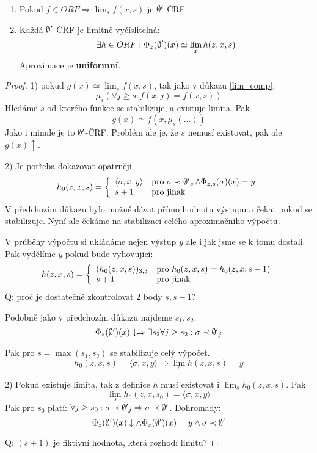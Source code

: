 \begin{theorem}
	\begin{enumerate}
		\item Pokud $f \in ORF \Rightarrow \lim_s f(x, s)$ je $\operatorname{\emptyset^{\prime}}$-ČRF.
		\item Každá $\operatorname{\emptyset^{\prime}}$-ČRF je limitně vyčíslitelná:
			\[ \exists h \in ORF: \Phi_{z}(\operatorname{\emptyset^{\prime}})(x) \simeq \lim_x h(z, x, s) \]
		Aproximace je \textbf{uniformní}.
	\end{enumerate}
\end{theorem}
\begin{proof}
	1) pokud $g(x) \simeq \lim_s f(x, s)$, tak jako v důkazu \cref{lim_comp}:
	\[ \mu_s(\forall j \geq s: f(x, j) = f(x, s)) \]
	Hledáme $s$ od kterého funkce se stabilizuje, a existuje limita.
	Pak
	\[ g(x) \simeq f(x, \mu_s(\ldots)) \]
	Jako i minule je to $\operatorname{\emptyset^{\prime}}$-ČRF.
	Problém ale je, že $s$ nemusí existovat, pak ale $g(x) \uparrow$.

	2) Je potřeba dokazovat opatrněji.
	\[ h_0(z, x, s) = \left\{ \begin{array}{ll}  \langle \sigma, x, y \rangle & \mbox{pro }  \sigma \prec \operatorname{\emptyset^{\prime}}_s \land \Phi_{z, s}(\sigma)(x) = y \\ s + 1 & \mbox{pro } \text{jinak} \end{array} \right. \]
	V předchozím důkazu bylo možné dávat přímo hodnotu výstupu a čekat pokud se stabilizuje.
	Nyní ale čekáme na stabilizaci celého aproximačního výpočtu.

	V průběhy výpočtu si ukládáme nejen výstup $y$ ale i jak jsme se k tomu dostali.
	Pak vydělíme $y$ pokud bude vyhovující:
	\[ h(z, x, s) = \left\{ \begin{array}{ll}  (h_0(z, x, s))_{3, 3}  & \mbox{pro }  h_0(z, x, s) = h_0(z, x, s - 1) \\ s + 1 & \mbox{pro } \text{jinak} \end{array} \right. \]
	Q: proč je dostatečné zkontrolovat 2 body $s, s - 1$?

	Podobně jako v předchozím důkazu najdeme $s_1, s_2$:
	\[ \Phi_z(\operatorname{\emptyset^{\prime}})(x) \downarrow \Rightarrow \exists s_2 \forall j \geq s_2: \sigma \prec \operatorname{\emptyset^{\prime}}_j \]

	Pak pro $s = \max(s_1, s_2)$ se stabilizuje celý výpočet.
	\[ h_0(z, x, s) = \langle \sigma, x, y \rangle \Rightarrow \lim_s h(z, x, s) = y \]

	2) Pokud existuje limita, tak z definice $h$ musí existovat i $\lim_s h_0(z, x, s)$.
	Pak
	\[ \lim_s h_0(z, x, s_0) = \langle \sigma, x, y \rangle \]
	Pak pro $s_0$ platí: $\forall j \geq s_0: \sigma \prec \operatorname{\emptyset^{\prime}}_j \Rightarrow \sigma \prec \operatorname{\emptyset^{\prime}}$.
	Dohromady:
	\[ \Phi_z(\operatorname{\emptyset^{\prime}})(x) \downarrow \land \Phi_z(\operatorname{\emptyset^{\prime}})(x) = y \land \sigma \prec \operatorname{\emptyset^{\prime}} \]

	Q: $(s + 1)$ je fiktivní hodnota, která rozhodí limitu?
\end{proof}

